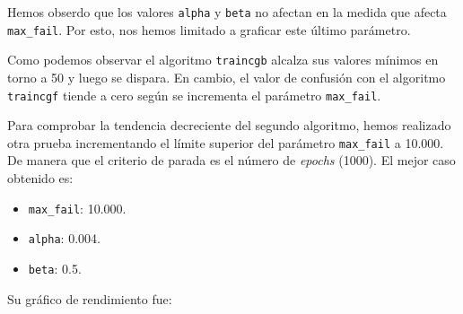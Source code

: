\documentclass[a4paper,12pt,titlepage]{article}
\begin{document}
Hemos obserdo que los valores \lstinline|alpha| y \lstinline|beta| no afectan en la medida que afecta \lstinline|max_fail|. Por esto, nos hemos limitado a graficar este último parámetro.


Como podemos observar el algoritmo \lstinline|traincgb| alcalza sus valores mínimos en torno a 50 y luego se dispara. En cambio, el valor de confusión con el algoritmo \lstinline|traincgf| tiende a cero según se incrementa el parámetro \lstinline|max_fail|. 

Para comprobar la tendencia decreciente del segundo algoritmo, hemos realizado otra prueba incrementando el límite superior del parámetro \lstinline|max_fail| a 10.000. De manera que el criterio de parada es el número de \textit{epochs} (1000). El mejor caso obtenido es:

\begin{itemize}[noitemsep]
	\item \lstinline|max_fail|: 10.000.
	\item \lstinline|alpha|: 0.004.
	\item \lstinline|beta|: 0.5.
\end{itemize}

\newpage

Su gráfico de rendimiento fue:
\end{document}
